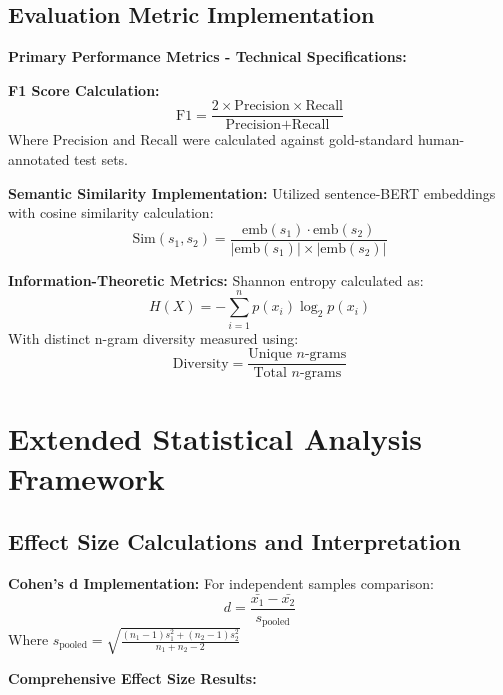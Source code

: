 \documentclass{article}
\begin{document}
\subsection{Evaluation Metric Implementation}

\textbf{Primary Performance Metrics - Technical Specifications:}

\textbf{F1 Score Calculation:}
\begin{equation}
\text{F1} = \frac{2 \times \text{Precision} \times \text{Recall}}{\text{Precision} + \text{Recall}}
\end{equation}
Where $\text{Precision}$ and $\text{Recall}$ were calculated against gold-standard human-annotated test sets.

\textbf{Semantic Similarity Implementation:}
Utilized sentence-BERT embeddings with cosine similarity calculation:
\begin{equation}
\text{Sim}(s_1, s_2) = \frac{\text{emb}(s_1) \cdot \text{emb}(s_2)}{|\text{emb}(s_1)| \times |\text{emb}(s_2)|}
\end{equation}

\textbf{Information-Theoretic Metrics:}
Shannon entropy calculated as:
\begin{equation}
H(X) = -\sum_{i=1}^{n} p(x_i) \log_2 p(x_i)
\end{equation}
With distinct n-gram diversity measured using:
\begin{equation}
\text{Diversity} = \frac{\text{Unique $n$-grams}}{\text{Total $n$-grams}}
\end{equation}

\section{Extended Statistical Analysis Framework}
\label{appendix:statistical_methods}

\subsection{Effect Size Calculations and Interpretation}

\textbf{Cohen's d Implementation:}
For independent samples comparison:
\begin{equation}
d = \frac{\bar{x_1} - \bar{x_2}}{s_{\text{pooled}}}
\end{equation}
Where $s_{\text{pooled}} = \sqrt{\frac{(n_1-1)s_1^2 + (n_2-1)s_2^2}{n_1 + n_2 - 2}}$

\textbf{Comprehensive Effect Size Results:}
\end{document}
